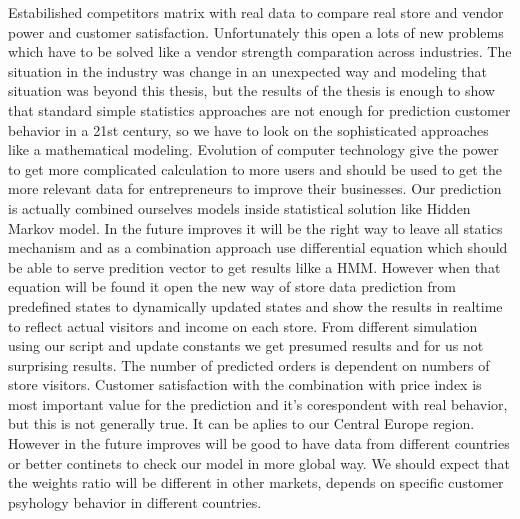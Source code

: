 Estabilished competitors matrix with real data to compare real store and vendor power and customer satisfaction.
Unfortunately this open a lots of new problems which have to be solved like a vendor strength comparation across industries.
The situation in the industry was change in an unexpected way and modeling that situation was beyond this thesis, but the results of the thesis is enough to show that standard
simple statistics approaches are not enough for prediction customer behavior in a 21st century, so we have to look on the sophisticated approaches like a mathematical modeling.
Evolution of computer technology give the power to get more complicated calculation to more users and should be used to get the more relevant data for entrepreneurs to improve their businesses.
Our prediction is actually combined ourselves models inside statistical solution like Hidden Markov model.
In the future improves it will be the right way to leave all statics mechanism and as a combination approach use differential equation which should be able to serve predition vector to get results lilke a HMM.
However when that equation will be found it open the new way of store data prediction from predefined states to dynamically updated states and show the results in realtime to reflect actual visitors and income on each store.
From different simulation using our script and update constants we get presumed results and for us not surprising results.
The number of predicted orders is dependent on numbers of store visitors.
Customer satisfaction with the combination with price index is most important value for the prediction and it's corespondent with real behavior, but this is not generally true.
It can be aplies to our Central Europe region.
However in the future improves will be good to have data from different countries or better continets to check our model in more global way.
We should expect that the weights ratio will be different in other markets, depends on specific customer psyhology behavior in different countries.
